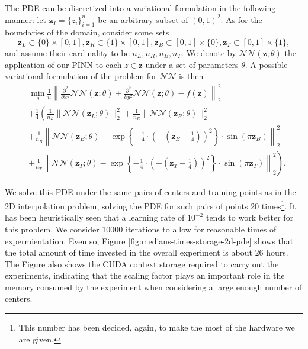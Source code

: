\documentclass[12pt]{report} %
\newcommand{\tmmathbf}[1]{\ensuremath{\boldsymbol{#1}}}
\begin{document}
The PDE can be discretized into a variational formulation in the following
manner: let $\tmmathbf{z}_I = \{ z_i \}_{i = 1}^n$ be an arbitrary subset of
$(0, 1)^2$. As for the boundaries of the domain, consider some sets
\[ \tmmathbf{z}_L \subset \{ 0 \} \times [0, 1], \tmmathbf{z}_R \subset \{ 1
   \} \times [0, 1], \tmmathbf{z}_B \subset [0, 1] \times \{ 0 \},
   \tmmathbf{z}_T \subset [0, 1] \times \{ 1 \}, \]
and assume their cardinality to be $n_L, n_R, n_B, n_T$. We denote by
$\mathcal{N}\mathcal{N} (\tmmathbf{z}; \theta)$ the application of our PINN to
each $z \in \tmmathbf{z}$ under a set of parameters $\theta$. A possible variational
formulation of the problem for $\mathcal{N}\mathcal{N}$ is then
\begin{align*}
    & \min_{\theta} \frac{1}{n} \left\| \frac{\partial^2}{\partial x^2} \mathcal{N}\mathcal{N} (\tmmathbf{z}; \theta) + \frac{\partial^2}{\partial y^2} \mathcal{N}\mathcal{N} (\tmmathbf{z}; \theta) - f(\tmmathbf{z}) \right\|_2^2 \\ 
    & + \frac{1}{4} \left( \frac{1}{n_L} \| \mathcal{N}\mathcal{N} (\tmmathbf{z}_L ; \theta) \|^2_2 + \frac{1}{n_R} \| \mathcal{N}\mathcal{N} (\tmmathbf{z}_R ; \theta) \|^2_2 \right.\\
    & + \frac{1}{n_B} \left\| \mathcal{N}\mathcal{N} (\tmmathbf{z}_B ; \theta) - \exp \left\{ - \frac{1}{4} \cdot \left( - \left( \tmmathbf{z}_B - \frac{1}{4} \right) \right)^2 \right\} \cdot \sin (\pi \tmmathbf{z}_B) \right\|_2^2\\
    & + \left. \frac{1}{n_T} \left\| \mathcal{N}\mathcal{N} (\tmmathbf{z}_T ; \theta) - \exp \left\{ - \frac{1}{4} \cdot \left( - \left( \tmmathbf{z}_T - \frac{1}{4} \right) \right)^2 \right\} \cdot \sin (\pi \tmmathbf{z}_T) \right\|_2^2 \right) .
\end{align*}


We solve this PDE under the same pairs of centers and training points as in the 2D interpolation problem, solving the PDE for such pairs of points 20 times\footnote{This number has been decided, again, to make the most of the hardware we are given.}. It has been heuristically seen that a learning rate of $10^{-2}$ tends to work better for this problem. We consider 10000 iterations to allow for reasonable times of expermientation. Even so, Figure \ref{fig:medians-times-storage-2d-pde} shows that the total amount of time invested in the overall experiment is about $26$ hours. The Figure also shows the CUDA context storage required to carry out the experiments, indicating that the scaling factor plays an important role in the memory consumed by the experiment when considering a large enough number of centers.
\end{document}
